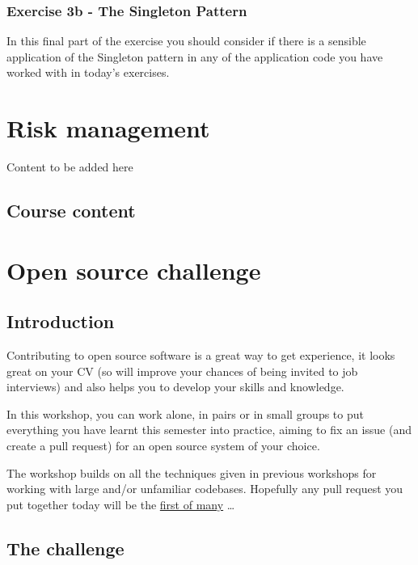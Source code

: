 \documentclass[
]{book}
\begin{document}
\hypertarget{singleton}{%
\subsection{Exercise 3b - The Singleton Pattern}\label{singleton}}

In this final part of the exercise you should consider if there is a sensible application of the Singleton pattern in any of the application code you have worked with in today's exercises.

\hypertarget{risking}{%
\chapter{Risk management}\label{risking}}

Content to be added here

\hypertarget{course-content-3}{%
\section{Course content}\label{course-content-3}}

\hypertarget{opening}{%
\chapter{Open source challenge}\label{opening}}

\hypertarget{introduction-1}{%
\section{Introduction}\label{introduction-1}}

Contributing to open source software is a great way to get experience, it looks great on your CV (so will improve your chances of being invited to job interviews) and also helps you to develop your skills and knowledge. \citep{experiencing, spinellis}

In this workshop, you can work alone, in pairs or in small groups to put everything you have learnt this semester into practice, aiming to fix an issue (and create a pull request) for an open source system of your choice.

The workshop builds on all the techniques given in previous workshops for working with large and/or unfamiliar codebases.
Hopefully any pull request you put together today will be the \href{http://firstpr.me}{first of many} \ldots{}

\hypertarget{challenge}{%
\section{The challenge}\label{challenge}}
\end{document}
